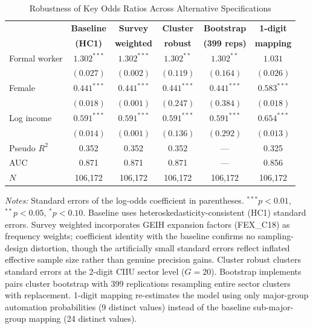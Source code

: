 \documentclass{article}
\begin{document}
\begin{table}[htbp]
\centering
\caption{Robustness of Key Odds Ratios Across Alternative Specifications}
\label{tab:robustness}
\begin{threeparttable}
\begin{tabular}{lccccc}
\toprule
& \textbf{Baseline} & \textbf{Survey} & \textbf{Cluster} & \textbf{Bootstrap} & \textbf{1-digit} \\
& \textbf{(HC1)} & \textbf{weighted} & \textbf{robust} & \textbf{(399 reps)} & \textbf{mapping} \\
\midrule
Formal worker & $1.302^{***}$ & $1.302^{***}$ & $1.302^{**}$ & $1.302^{**}$ & $1.031$ \\
& $(0.027)$ & $(0.002)$ & $(0.119)$ & $(0.164)$ & $(0.026)$ \\[4pt]
Female & $0.441^{***}$ & $0.441^{***}$ & $0.441^{***}$ & $0.441^{***}$ & $0.583^{***}$ \\
& $(0.018)$ & $(0.001)$ & $(0.247)$ & $(0.384)$ & $(0.018)$ \\[4pt]
Log income & $0.591^{***}$ & $0.591^{***}$ & $0.591^{***}$ & $0.591^{***}$ & $0.654^{***}$ \\
& $(0.014)$ & $(0.001)$ & $(0.136)$ & $(0.292)$ & $(0.013)$ \\[4pt]
\midrule
Pseudo $R^2$ & 0.352 & 0.352 & 0.352 & --- & 0.325 \\
AUC & 0.871 & 0.871 & 0.871 & --- & 0.856 \\
$N$ & 106{,}172 & 106{,}172 & 106{,}172 & 106{,}172 & 106{,}172 \\
\bottomrule
\end{tabular}
\begin{tablenotes}
\small
\item \textit{Notes:} Standard errors of the log-odds coefficient in parentheses. $^{***}p<0.01$, $^{**}p<0.05$, $^{*}p<0.10$. Baseline uses heteroskedasticity-consistent (HC1) standard errors. Survey weighted incorporates GEIH expansion factors (FEX\_C18) as frequency weights; coefficient identity with the baseline confirms no sampling-design distortion, though the artificially small standard errors reflect inflated effective sample size rather than genuine precision gains. Cluster robust clusters standard errors at the 2-digit CIIU sector level ($G = 20$). Bootstrap implements pairs cluster bootstrap \cite{cameron2008bootstrap} with 399 replications resampling entire sector clusters with replacement. 1-digit mapping re-estimates the model using only major-group automation probabilities (9 distinct values) instead of the baseline sub-major-group mapping (24 distinct values).
\end{tablenotes}
\end{threeparttable}
\end{table}
\end{document}
